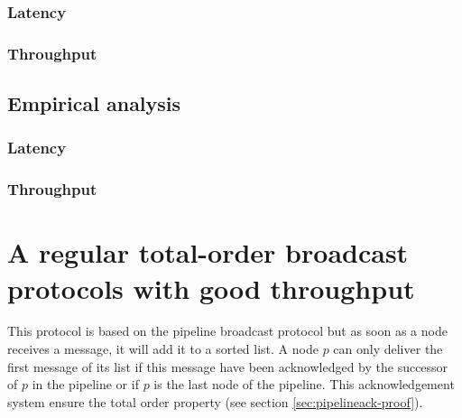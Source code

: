 \documentclass[a4paper]{article}
\begin{document}
        \subsubsection*{Latency}

        \subsubsection*{Throughput}

        \subsection{Empirical analysis}

        \subsubsection*{Latency}

        \subsubsection*{Throughput}

        \section{A regular total-order broadcast protocols with good throughput}
        \label{sec:throughputTO}

        This protocol is based on the pipeline broadcast protocol but as soon as a node
        receives a message, it will add it to a sorted list. A node $p$ can only deliver the
        first message of its list if this message have been acknowledged by the
        successor of $p$ in the pipeline or if $p$ is the last node of the pipeline.
        This acknowledgement system ensure the total order property (see section
        \ref{sec:pipelineack-proof}).
\end{document}
